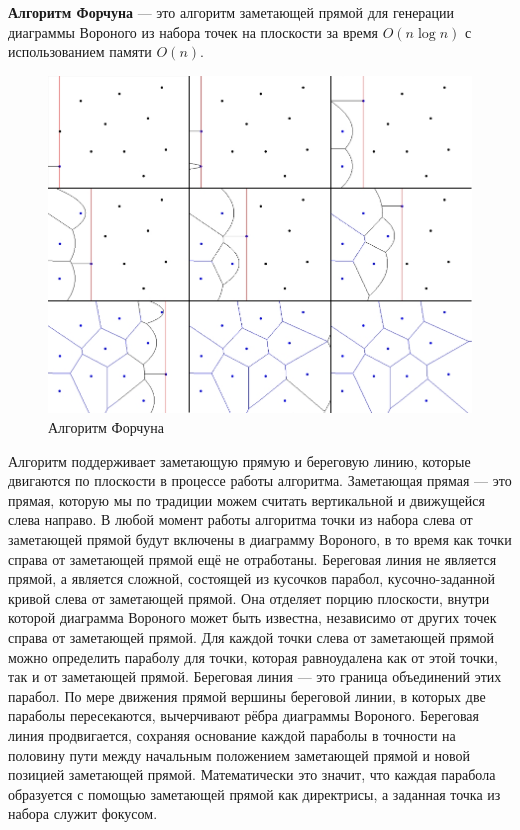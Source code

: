 \textbf{Алгоритм Форчуна} — это алгоритм заметающей прямой для генерации диаграммы Вороного из набора точек на плоскости за время $O(n \log n)$ с использованием памяти $O(n)$.


\begin{figure}[H]
    \centering
    \includegraphics[width=1\linewidth]{fortunes-algo.jpg}
    \caption{Алгоритм Форчуна}
\end{figure}

Алгоритм поддерживает заметающую прямую и береговую линию, которые двигаются по плоскости в процессе работы алгоритма. Заметающая прямая — это прямая, которую мы по традиции можем считать вертикальной и движущейся слева направо. В любой момент работы алгоритма точки из набора слева от заметающей прямой будут включены в диаграмму Вороного, в то время как точки справа от заметающей прямой ещё не отработаны. Береговая линия не является прямой, а является сложной, состоящей из кусочков парабол, кусочно-заданной кривой слева от заметающей прямой. Она отделяет порцию плоскости, внутри которой диаграмма Вороного может быть известна, независимо от других точек справа от заметающей прямой. Для каждой точки слева от заметающей прямой можно определить параболу для точки, которая равноудалена как от этой точки, так и от заметающей прямой. Береговая линия — это граница объединений этих парабол. По мере движения прямой вершины береговой линии, в которых две параболы пересекаются, вычерчивают рёбра диаграммы Вороного. Береговая линия продвигается, сохраняя основание каждой параболы в точности на половину пути между начальным положением заметающей прямой и новой позицией заметающей прямой. Математически это значит, что каждая парабола образуется с помощью заметающей прямой как директрисы, а заданная точка из набора служит фокусом.

